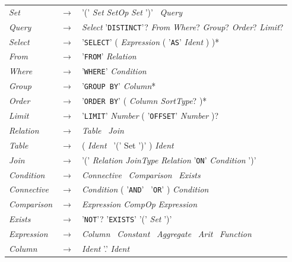 \documentclass[11pt,a4paper]{globis-book}
\begin{document}
\begin{table}[h]
\centering
\begin{tabu} to \textwidth {l c l}
\toprule
\textit{Set}				& $\rightarrow$	& '(' \textit{Set} \textit{SetOp} \textit{Set} ')' \textbar~\textit{Query} \\[2pt]
\textit{Query}				& $\rightarrow$ & \textit{Select} '\texttt{DISTINCT}'? \textit{From} \textit{Where}? \textit{Group}? \textit{Order}? \textit{Limit}? \\[2pt]
\textit{Select}				& $\rightarrow$	& '\texttt{SELECT}' ( \textit{Expression} ( '\texttt{AS}' \textit{Ident} ) )* \\[2pt]
\textit{From}				& $\rightarrow$	& '\texttt{FROM}' \textit{Relation} \\[2pt]
\textit{Where}				& $\rightarrow$	& '\texttt{WHERE}' \textit{Condition} \\[2pt]
\textit{Group}				& $\rightarrow$	& '\texttt{GROUP BY}' \textit{Column}* \\[2pt]
\textit{Order}				& $\rightarrow$	& '\texttt{ORDER BY}' ( \textit{Column SortType}? )* \\[2pt]
\textit{Limit}				& $\rightarrow$	& '\texttt{LIMIT}' \textit{Number} ( '\texttt{OFFSET}' \textit{Number} )? \\[2pt]
\textit{Relation}			& $\rightarrow$	& \textit{Table} \textbar~\textit{Join} \\[2pt]
\textit{Table}				& $\rightarrow$	& ( \textit{Ident} \textbar~'(' Set ')' ) \textit{Ident} \\[2pt]
\textit{Join}				& $\rightarrow$	& '(' \textit{Relation} \textit{JoinType} \textit{Relation} '\texttt{ON}' \textit{Condition} ')' \\[2pt]
\textit{Condition}			& $\rightarrow$	& \textit{Connective} \textbar~\textit{Comparison} \textbar~\textit{Exists} \\[2pt]
\textit{Connective}			& $\rightarrow$	& \textit{Condition} ( '\texttt{AND}' \textbar~'\texttt{OR}' ) \textit{Condition} \\[2pt]
\textit{Comparison}			& $\rightarrow$	& \textit{Expression} \textit{CompOp} \textit{Expression} \\[2pt]
\textit{Exists}				& $\rightarrow$	& '\texttt{NOT}'? '\texttt{EXISTS}' '(' \textit{Set} ')' \\[2pt]
\textit{Expression}			& $\rightarrow$	& \textit{Column} \textbar~\textit{Constant} \textbar~\textit{Aggregate} \textbar~\textit{Arit} \textbar~\textit{Function} \\[2pt]
\textit{Column}				& $\rightarrow$	& \textit{Ident} '.' \textit{Ident} \\[2pt]

\end{tabu}
\end{table}
\end{document}
